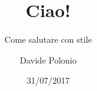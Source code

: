 \documentclass{beamer}
\title{Ciao!}
\subtitle{Come salutare con stile}
\date{31/07/2017}
\author{Davide Polonio}
\institute{Università degli studi di Padova}
\begin{document}
 \begin{frame}
  \maketitle
 \end{frame}
\end{document}
